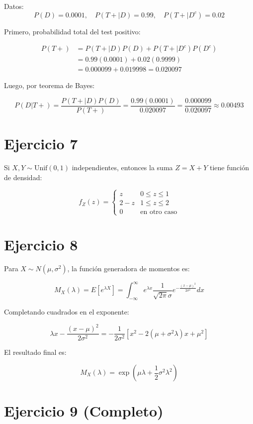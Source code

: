 \documentclass{article}
\begin{document}
Datos:
\[
P(D) = 0.0001,\quad P(T+|D) = 0.99,\quad P(T+|D^c) = 0.02
\]

Primero, probabilidad total del test positivo:

\[
\begin{aligned}
P(T+) &= P(T+|D)P(D) + P(T+|D^c)P(D^c) \\
&= 0.99(0.0001) + 0.02(0.9999) \\
&= 0.000099 + 0.019998 = 0.020097
\end{aligned}
\]

Luego, por teorema de Bayes:

\[
P(D|T+) = \frac{P(T+|D)P(D)}{P(T+)} = \frac{0.99(0.0001)}{0.020097} = \frac{0.000099}{0.020097} \approx 0.00493
\]

\section*{Ejercicio 7}

Si \(X, Y \sim \text{Unif}(0,1)\) independientes, entonces la suma \(Z = X + Y\) tiene función de densidad:

\[
f_Z(z) = 
\begin{cases} 
z & 0 \leq z \leq 1 \\
2 - z & 1 \leq z \leq 2 \\
0 & \text{en otro caso}
\end{cases}
\]

\section*{Ejercicio 8}

Para \(X \sim N(\mu, \sigma^2)\), la función generadora de momentos es:

\[
M_X(\lambda) = E[e^{\lambda X}] = \int_{-\infty}^{\infty} e^{\lambda x} \frac{1}{\sqrt{2\pi}\sigma} e^{-\frac{(x-\mu)^2}{2\sigma^2}} dx
\]

Completando cuadrados en el exponente:

\[
\lambda x - \frac{(x-\mu)^2}{2\sigma^2} = -\frac{1}{2\sigma^2}\left[x^2 - 2(\mu + \sigma^2\lambda)x + \mu^2\right]
\]

El resultado final es:

\[
M_X(\lambda) = \exp\left(\mu\lambda + \frac{1}{2}\sigma^2\lambda^2\right)
\]

\section*{Ejercicio 9 (Completo)}
\end{document}
